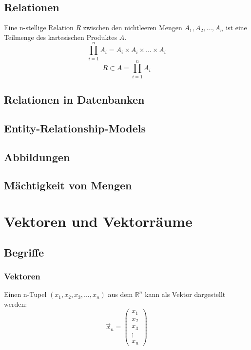 \subsection{Relationen}
Eine n-stellige Relation $R$ zwischen den nichtleeren Mengen $A_1, A_2,
..., A_n$ ist eine Teilmenge des kartesischen Produktes $A$.
\[ \prod \limits_{i=1}^{n}A_i = A_i \times A_i \times ...  \times A_i \]
\[ R \subset A = \prod \limits_{i=1}^{n}A_i \]

\subsection{Relationen in Datenbanken}
\subsection{Entity-Relationship-Models}
\subsection{Abbildungen}
\subsection{Mächtigkeit von Mengen}

\section{Vektoren und Vektorräume}

\subsection{Begriffe}
\subsubsection{Vektoren}
Einen n-Tupel $(x_1, x_2, x_3, ..., x_n)$ aus dem $\mathbb{R}^n$ kann
als Vektor dargestellt werden:
\[ \vec x_n = \left(
    \begin {array} {c}
        x_1 \\
        x_2 \\
        x_3 \\
        \vdots \\
        x_n
    \end {array}
  \right) \]

